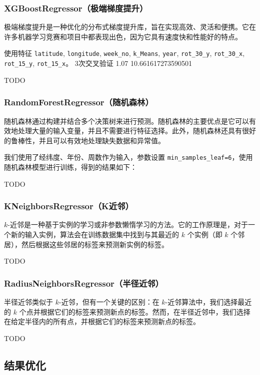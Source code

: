 \documentclass{ctexart}
\begin{document}
\subsubsection{XGBoostRegressor（极端梯度提升）}

极端梯度提升是一种优化的分布式梯度提升库，旨在实现高效、灵活和便携。它在许多机器学习竞赛和项目中都表现出色，因为它具有速度快和性能好的特点。

使用特征 \texttt{latitude}, \texttt{longitude}, \texttt{week\_no}, \texttt{k\_Means}, \texttt{year}, \texttt{rot\_30\_y}, \texttt{rot\_30\_x}, \texttt{rot\_15\_y}, \texttt{rot\_15\_x}。
3次交叉验证
1.07
10.661617273590501

TODO

\subsubsection{RandomForestRegressor（随机森林）}

随机森林通过构建并结合多个决策树来进行预测。随机森林的主要优点是它可以有效地处理大量的输入变量，并且不需要进行特征选择。此外，随机森林还具有很好的鲁棒性，并且可以有效地处理缺失数据和异常值。

我们使用了经纬度、年份、周数作为输入，参数设置 \texttt{min\_samples\_leaf=6}，使用随机森林模型进行训练，得到的结果如下：

TODO

\subsubsection{KNeighborsRegressor（K近邻）}

$k$-近邻是一种基于实例的学习或非参数懒惰学习的方法。它的工作原理是，对于一个新的输入实例，算法会在训练数据集中找到与其最近的 $k$ 个实例（即 $k$ 个邻居），然后根据这些邻居的标签来预测新实例的标签。

TODO

\subsubsection{RadiusNeighborsRegressor（半径近邻）}

半径近邻类似于 $k$-近邻，但有一个关键的区别：在 $k$-近邻算法中，我们选择最近的 $k$ 个点并根据它们的标签来预测新点的标签。然而，在半径近邻中，我们选择在给定半径内的所有点，并根据它们的标签来预测新点的标签。

TODO

\subsection{结果优化}
\end{document}
